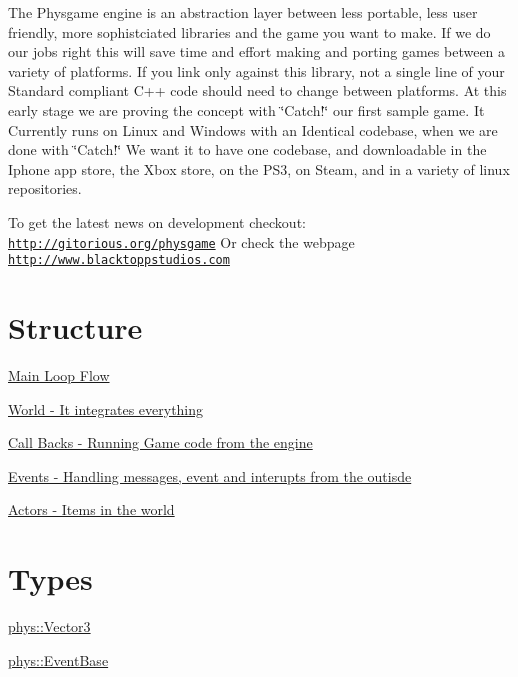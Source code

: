 The Physgame engine is an abstraction layer between less portable, less user friendly, more sophistciated libraries and the game you want to make. If we do our jobs right this will save time and effort making and porting games between a variety of platforms. If you link only against this library, not a single line of your Standard compliant C++ code should need to change between platforms. At this early stage we are proving the concept with \char`\"{}Catch!\char`\"{} our first sample game. It Currently runs on Linux and Windows with an Identical codebase, when we are done with \char`\"{}Catch!\char`\"{} We want it to have one codebase, and downloadable in the Iphone app store, the Xbox store, on the PS3, on Steam, and in a variety of linux repositories.

To get the latest news on development checkout: \href{http://gitorious.org/physgame}{\tt http://gitorious.org/physgame} Or check the webpage \href{http://www.blacktoppstudios.com}{\tt http://www.blacktoppstudios.com}\hypertarget{index_Engine}{}\section{Structure}\label{index_Engine}
\hyperlink{mainloop1}{Main Loop Flow}

\hyperlink{classphys_1_1World}{World -\/ It integrates everything}

\hyperlink{classphys_1_1CallBackManager}{Call Backs -\/ Running Game code from the engine}

\hyperlink{classphys_1_1EventManager}{Events -\/ Handling messages, event and interupts from the outisde}

\hyperlink{classphys_1_1ActorBase}{Actors -\/ Items in the world}\hypertarget{index_Data}{}\section{Types}\label{index_Data}
\hyperlink{classphys_1_1Vector3}{phys::Vector3}

\hyperlink{classphys_1_1EventBase}{phys::EventBase} 